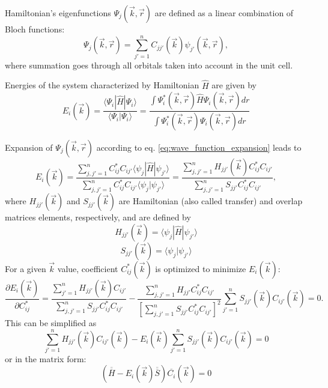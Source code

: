 Hamiltonian's eigenfunctions $\Psi_j(\vec{k}, \vec{r})$ are defined as a linear combination of Bloch functions:
\begin{equation} \label{eq:wave_function_expansion}
	\Psi_j(\vec{k}, \vec{r}) = \sum_{j'=1}^{n} C_{jj'}(\vec{k}) \psi_{j'}(\vec{k}, \vec{r}),
\end{equation}
where summation goes through all orbitals taken into account in the unit cell.

Energies of the system characterized by Hamiltonian $\hat{H}$ are given by
\begin{equation}
	E_i(\vec{k}) = \frac{\langle \Psi_i | \hat{H} | \Psi_i \rangle}{\langle \Psi_i | \Psi_i \rangle} = \frac{\int \Psi^*_i(\vec{k}, \vec{r}) \hat{H} \Psi_i(\vec{k}, \vec{r}) dr}{\int \Psi^*_i(\vec{k}, \vec{r}) \Psi_i(\vec{k}, \vec{r}) dr}
\end{equation}

Expansion of $\Psi_j(\vec{k}, \vec{r})$ according to eq. \ref{eq:wave_function_expansion} leads to
\begin{equation}
	E_i(\vec{k}) = \frac{\sum\limits_{j,j'=1}^{n} C^*_{ij} C_{ij'} \langle \psi_j | \hat{H} | \psi_{j'} \rangle}{\sum\limits_{j,j'=1}^{n} C^*_{ij} C_{ij'} \langle \psi_j | \psi_{j'} \rangle} = \frac{\sum\limits_{j,j'=1}^{n} H_{jj'}(\vec{k}) C^*_{ij} C_{ij'}}{\sum\limits_{j,j'=1}^{n} S_{jj'} C^*_{ij} C_{ij'}},
\end{equation} 
where $H_{jj'}(\vec{k})$ and $S_{jj'}(\vec{k})$ are Hamiltonian (also called transfer) and overlap matrices elements, respectively, and are defined by
\begin{equation} \label{eq:h_matrix}
	H_{jj'}(\vec{k}) = \langle \psi_j | \hat{H} | \psi_{j'} \rangle
\end{equation}
\begin{equation} \label{eq:s_matrix}
	S_{jj'}(\vec{k}) = \langle \psi_j | \psi_{j'} \rangle
\end{equation}
For a given $\vec{k}$ value, coefficient $C^*_{ij}(\vec{k})$ is optimized to minimize $E_i(\vec{k})$:
\begin{equation}
	\frac{\partial E_i (\vec{k})}{\partial C^*_{ij}} = \frac{\sum\limits_{j'=1}^{n} H_{jj'}(\vec{k}) C_{ij'}}{\sum\limits_{j,j'=1}^{n} S_{jj'} C^*_{ij} C_{ij'}} - \frac{\sum\limits_{j,j'=1}^{n} H_{jj'} C^*_{ij} C_{ij'}}{[\sum\limits_{j,j'=1}^{n} S_{jj'} C^*_{ij} C_{ij'}]^2} \sum\limits_{j'=1}^{n} S_{jj'}(\vec{k}) C_{ij'}(\vec{k}) = 0.
\end{equation}
This can be simplified as 
\begin{equation}
	\sum_{j'=1}^{n} H_{jj'}(\vec{k}) C_{ij'}(\vec{k}) - E_i(\vec{k}) \sum_{j'=1}^{n} S_{jj'}(\vec{k}) C_{ij'}(\vec{k}) = 0
\end{equation}
or in the matrix form:
\begin{equation} \label{eq:secular}
	(\overline{\overline{H}} - E_i(\vec{k})\overline{\overline{S}})\overline{C_i}(\vec{k}) = 0
\end{equation}

